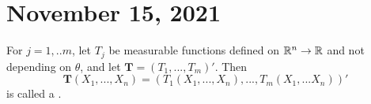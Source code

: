 \section{November 15, 2021}
For $j = 1,..m$, let $T_j$ be measurable functions defined on $\mathbb R^n \to \mathbb R$ and not depending on $\theta$, and let $\boldsymbol{T} = (T_1,...,T_m)'$. Then
$$
\boldsymbol{T}(X_1,...,X_n) = \left(
T_1(X_1,...,X_n),...,T_m(X_1,...X_n)
\right)'
$$
is called a . 